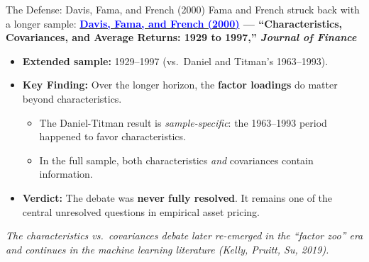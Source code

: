 \documentclass{beamer}
\begin{document}
\begin{frame}{The Defense: Davis, Fama, and French (2000)}
	Fama and French struck back with a longer sample:
	\vspace{4pt}
	\textbf{\href{https://doi.org/10.1111/0022-1082.00209}{\textcolor{blue}{Davis, Fama, and French (2000)}} --- ``Characteristics, Covariances, and Average Returns: 1929 to 1997,'' \textit{Journal of Finance}}
	\vspace{6pt}
	\begin{itemize}
		\item \textbf{Extended sample:} 1929--1997 (vs.\ Daniel and Titman's 1963--1993).
		\item \textbf{Key Finding:} Over the longer horizon, the \textbf{factor loadings} do matter beyond characteristics.
		\begin{itemize}
			\item The Daniel-Titman result is \textit{sample-specific}: the 1963--1993 period happened to favor characteristics.
			\item In the full sample, both characteristics \textit{and} covariances contain information.
		\end{itemize}
		\item \textbf{Verdict:} The debate was \textbf{never fully resolved}. It remains one of the central unresolved questions in empirical asset pricing.
	\end{itemize}
	\vspace{4pt}
	\footnotesize \textit{The characteristics vs.\ covariances debate later re-emerged in the ``factor zoo'' era and continues in the machine learning literature (Kelly, Pruitt, Su, 2019).}
\end{frame}
\end{document}
